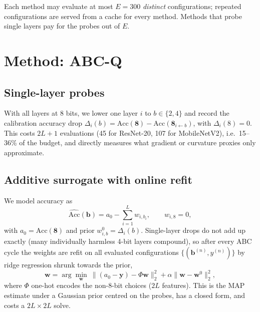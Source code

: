 \documentclass[11pt,a4paper]{article}
\begin{document}
Each method may evaluate at most $E=300$ \emph{distinct} configurations; repeated configurations are
served from a cache for every method. Methods that probe single layers pay for the probes out of $E$.

\section{Method: ABC-Q}
\label{sec:method}

\subsection{Single-layer probes}
With all layers at 8 bits, we lower one layer $i$ to $b\in\{2,4\}$ and record the calibration
accuracy drop $\Delta_i(b)=\mathrm{Acc}(\mathbf 8)-\mathrm{Acc}(\mathbf 8_{i\leftarrow b})$, with
$\Delta_i(8)=0$. This costs $2L+1$ evaluations (45 for ResNet-20, 107 for MobileNetV2), i.e.\ 15--36\%
of the budget, and directly measures what gradient or curvature proxies only approximate.

\subsection{Additive surrogate with online refit}
We model accuracy as
\begin{equation}
  \widehat{\mathrm{Acc}}(\mathbf b)=a_0-\sum_{i=1}^{L} w_{i,b_i},\qquad w_{i,8}=0,
\end{equation}
with $a_0=\mathrm{Acc}(\mathbf 8)$ and prior $w^{0}_{i,b}=\Delta_i(b)$. Single-layer drops do not add
up exactly (many individually harmless 4-bit layers compound), so after every ABC cycle the weights
are refit on all evaluated configurations $\{(\mathbf b^{(n)},y^{(n)})\}$ by ridge regression shrunk
towards the prior,
\begin{equation}
  \mathbf w=\arg\min_{\mathbf w}\ \big\|(a_0-\mathbf y)-\Phi\mathbf w\big\|_2^2+\alpha\|\mathbf w-\mathbf w^0\|_2^2,
\end{equation}
where $\Phi$ one-hot encodes the non-8-bit choices ($2L$ features). This is the MAP estimate under a
Gaussian prior centred on the probes, has a closed form, and costs a $2L\times 2L$ solve.
\end{document}
